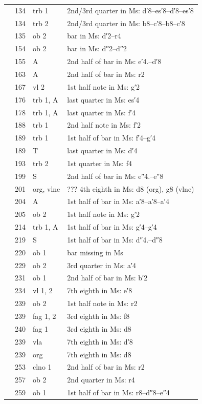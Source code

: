 \documentclass[parskip=full]{scrreprt}
\begin{document}
\begin{longtable}{lll L{10cm}}
	  & 134 & trb 1    & 2nd/3rd quarter in Ms: d′8–es′8–d′8–es′8 \\
	  & 134 & trb 2    & 2nd/3rd quarter in Ms: b8–c′8–b8–c′8 \\
	  & 135 & ob 2     & bar in Ms: d′2–r4 \\
	  & 154 & ob 2     & bar in Ms: d″2–d″2 \\
	  & 155 & A        & 2nd half of bar in Ms: e′4.–d′8 \\
	  & 163 & A        & 2nd half of bar in Ms: r2 \\
	  & 167 & vl 2     & 1st half note in Ms: g′2 \\
	  & 176 & trb 1, A & last quarter in Ms: es′4 \\
	  & 178 & trb 1, A & last quarter in Ms: f′4 \\
	  & 188 & trb 1    & 2nd half note in Ms: f′2 \\
	  & 189 & trb 1    & 1st half of bar in Ms: f′4–g′4 \\
	  & 189 & T        & last quarter in Ms: d′4 \\
	  & 193 & trb 2    & 1st quarter in Ms: f4 \\
	  & 199 & S        & 2nd half of bar in Ms: e″4.–e″8 \\
	  & 201 & org, vlne & ??? 4th eighth in Ms: d8 (org), g8 (vlne) \\
	  & 204 & A        & 1st half of bar in Ms: a′8–a′8–a′4 \\
	  & 205 & ob 2     & 1st half note in Ms: g′2 \\
	  & 214 & trb 1, A & 1st half of bar in Ms: g′4–g′4 \\
	  & 219 & S        & 1st half of bar in Ms: d″4.–d″8 \\
	  & 220 & ob 1     & bar missing in Ms \\
	  & 229 & ob 2     & 3rd quarter in Ms: a′4 \\
	  & 231 & ob 1     & 2nd half of bar in Ms: b′2 \\
	  & 234 & vl 1, 2  & 7th eighth in Ms: e′8 \\
	  & 239 & ob 2     & 1st half note in Ms: r2 \\
	  & 239 & fag 1, 2 & 3rd eighth in Ms: f8 \\
	  & 240 & fag 1    & 3rd eighth in Ms: d8 \\
	  & 239 & vla      & 7th eighth in Ms: d′8 \\
	  & 239 & org      & 7th eighth in Ms: d8 \\
	  & 253 & clno 1   & 2nd half of bar in Ms: r2 \\
	  & 257 & ob 2     & 2nd quarter in Ms: r4 \\
	  & 259 & ob 1     & 1st half of bar in Ms: r8–d″8–e″4 \\
	\bottomrule
\end{longtable}
\end{document}
